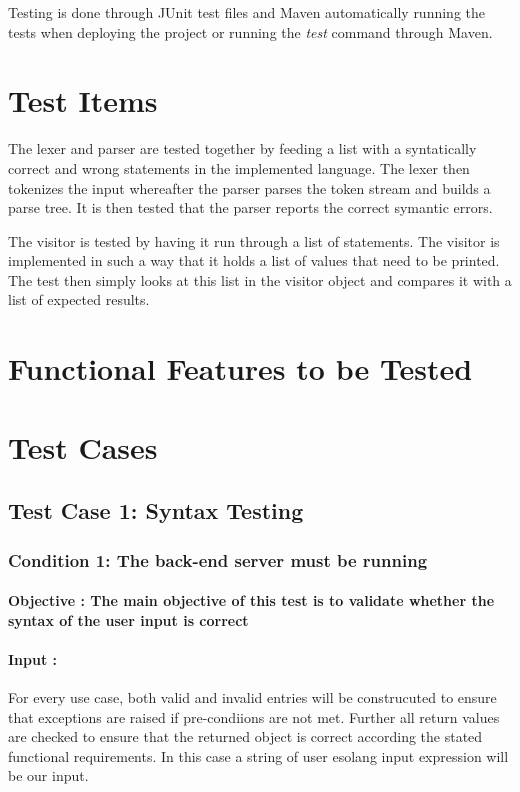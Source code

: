 \documentclass[english]{article}
\begin{document}
			Testing is done through JUnit test files and Maven automatically running the tests when deploying the project or running the \textit{test} command through Maven.
		\section{Test Items}
			The lexer and parser are tested together by feeding a list with a syntatically correct and wrong statements in the implemented language. The lexer then tokenizes the input whereafter the parser parses the token stream and builds a parse tree. It is then tested that the parser reports the correct symantic errors.
			
			The visitor is tested by having it run through a list of statements. The visitor is implemented in such a way that it holds a list of values that need to be printed. The test then simply looks at this list in the visitor object and compares it with a list of expected results.
		
	\section{Functional Features to be Tested}
		\section{Test Cases}

			\subsection{Test Case 1: Syntax Testing}
			\subsubsection{Condition 1: The back-end server must be running }
			\paragraph{Objective : The main objective of this test is to validate whether the syntax of the user input is correct }
			\paragraph{Input :} For every use case, both valid and invalid entries will be construcuted to ensure that exceptions are raised if pre-condiions are not met. Further all return values are checked to ensure that the returned object is correct according the stated
			functional requirements. In this case a string of user  esolang input expression will be our input.
			
\end{document}
